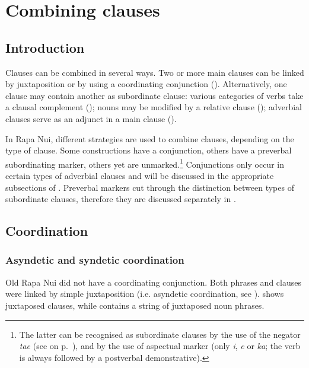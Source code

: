 \chapter[Combining clauses]{Combining clauses}\label{ch:11}
\section{Introduction}\label{sec:11.1}

Clauses can be combined in several ways. Two or more main clauses can be linked by juxtaposition or by using a coordinating conjunction (). Alternatively, one clause may contain another as subordinate clause: various categories of verbs take a clausal complement (); nouns may be modified by a relative clause (); adverbial clauses serve as an adjunct in a main clause ().

In Rapa Nui, different strategies are used to combine clauses, depending on the type of clause. Some constructions have a conjunction, others have a preverbal subordinating marker, others yet are unmarked.\footnote{\label{fn:503}The latter can be recognised as subordinate clauses by the use of the negator \textit{ta{\ꞌ}e} (see  on p.~\pageref{ex:11.210}), and by the use of aspectual marker (only \textit{i}, \textit{e} or \textit{ka}; the verb is always followed by a postverbal demonstrative).} Conjunctions only occur in certain types of adverbial clauses and will be discussed in the appropriate subsections of . Preverbal markers cut through the distinction between types of subordinate clauses, therefore they are discussed separately in .

\section{Coordination} \label{sec:11.2}
\subsection{Asyndetic and syndetic coordination}\label{sec:11.2.1}

Old Rapa Nui did not have a coordinating conjunction. Both phrases and clauses were linked by simple juxtaposition (i.e. asyndetic coordination, see \citealt[7]{Haspelmath2007}).  shows juxtaposed clauses, while  contains a string of juxtaposed noun phrases.

